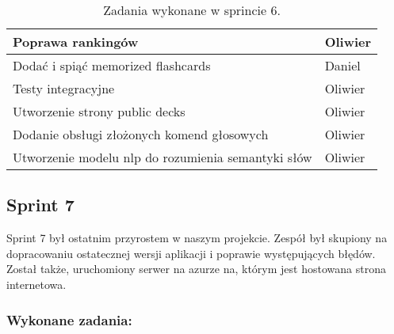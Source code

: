 \begin{table}[H]
\begin{tabularx}{\textwidth}{|p{}|X|}
    \hline
    [WEB] Poprawa rankingów & Oliwier \\
    \hline
    [MOBILE] Dodać i spiąć memorized flashcards & Daniel \\
    \hline
    [BACKEND] Testy integracyjne & Oliwier \\
    \hline
    [WEB] Utworzenie strony public decks & Oliwier \\
    \hline
    [WEB] Dodanie obsługi złożonych komend głosowych & Oliwier \\
    \hline
    [BACKEND] Utworzenie modelu nlp do rozumienia semantyki słów & Oliwier \\
    \hline
\end{tabularx}
                    \caption{Zadania wykonane w sprincie 6.}
\end{table}

\subsection{Sprint 7}

Sprint 7 był ostatnim przyrostem w naszym projekcie. Zespół był skupiony na dopracowaniu ostatecznej wersji aplikacji i poprawie występujących błędów. Został także, uruchomiony serwer na azurze na, którym jest hostowana strona internetowa.

\subsubsection{Wykonane zadania:}

